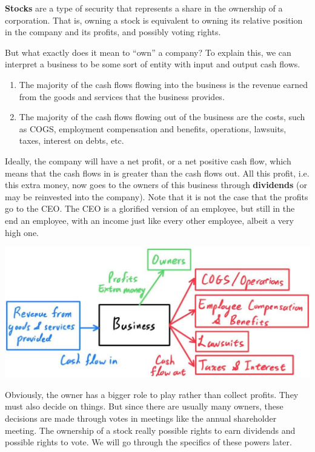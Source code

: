 \documentclass{article}
\begin{document}
    \begin{definition}[Stocks]
      \textbf{Stocks} are a type of security that represents a share in the ownership of a corporation. That is, owning a stock is equivalent to owning its relative position in the company and its profits, and possibly voting rights. 
    \end{definition}

    But what exactly does it mean to ``own'' a company? To explain this, we can interpret a business to be some sort of entity with input and output cash flows.
    \begin{enumerate}
      \item The majority of the cash flows flowing into the business is the revenue earned from the goods and services that the business provides. 
      \item The majority of the cash flows flowing out of the business are the costs, such as COGS, employment compensation and benefits, operations, lawsuits, taxes, interest on debts, etc.
    \end{enumerate}
    Ideally, the company will have a net profit, or a net positive cash flow, which means that the cash flows in is greater than the cash flows out. All this profit, i.e. this extra money, now goes to the owners of this business through \textbf{dividends} (or may be reinvested into the company). Note that it is not the case that the profits go to the CEO. The CEO is a glorified version of an employee, but still in the end an employee, with an income just like every other employee, albeit a very high one. 
    \begin{center}
      \includegraphics[scale=0.27]{img/Business_Cash_Flow.jpg}
    \end{center}
    Obviously, the owner has a bigger role to play rather than collect profits. They must also decide on things. But since there are usually many owners, these decisions are made through votes in meetings like the annual shareholder meeting. The ownership of a stock really possible rights to earn dividends and possible rights to vote. We will go through the specifics of these powers later. 
\end{document}
